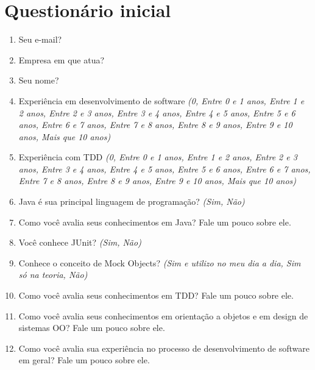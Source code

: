 \chapter{Questionário inicial}
\label{ape:questionario-inicio}

\begin{enumerate}

\item Seu e-mail?

\item Empresa em que atua?

\item Seu nome?

\item Experiência em desenvolvimento de software \textit{(0, Entre 0 e 1 anos, Entre 1 e 2 anos, Entre 2 e 3 anos, Entre 3 e 4 anos, Entre 4 e 5 anos, Entre 5 e 6 anos, Entre 6 e 7 anos, Entre 7 e 8 anos, Entre 8 e 9 anos, Entre 9 e 10 anos, Mais que 10 anos)}

\item Experiência com TDD \textit{(0, Entre 0 e 1 anos, Entre 1 e 2 anos, Entre 2 e 3 anos, Entre 3 e 4 anos, Entre 4 e 5 anos, Entre 5 e 6 anos, Entre 6 e 7 anos, Entre 7 e 8 anos, Entre 8 e 9 anos, Entre 9 e 10 anos, Mais que 10 anos)}

\item Java é sua principal linguagem de programação? \textit{(Sim, Não)}

\item Como você avalia seus conhecimentos em Java? Fale um pouco sobre ele.	

\item Você conhece JUnit? \textit{(Sim, Não)}

\item Conhece o conceito de Mock Objects? \textit{(Sim e utilizo no meu dia a dia, Sim só na teoria, Não)}

\item Como você avalia seus conhecimentos em TDD? Fale um pouco sobre ele.	

\item Como você avalia seus conhecimentos em orientação a objetos e em design de sistemas OO? Fale um pouco sobre ele.	

\item Como você avalia sua experiência no processo de desenvolvimento de software em geral? Fale um pouco sobre ele.	

\end{enumerate}
